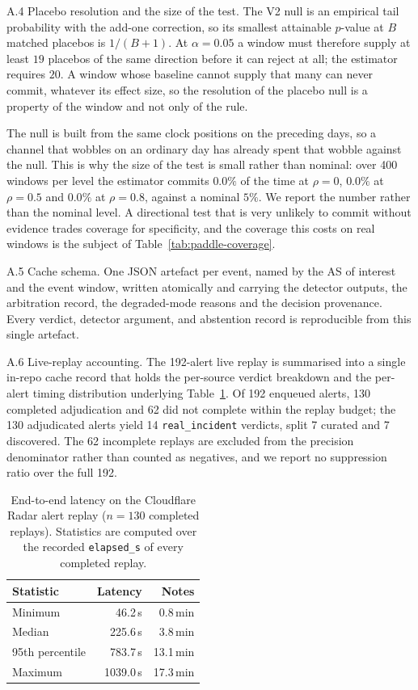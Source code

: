 A.4 Placebo resolution and the size of the test.\label{app:paddle-size}
The V2 null is an empirical tail probability with the add-one correction,
so its smallest attainable $p$-value at $B$ matched placebos is $1/(B+1)$.
At $\alpha=0.05$ a window must therefore supply at least $19$ placebos of
the same direction before it can reject at all; the estimator requires
$20$. A window whose baseline cannot supply that many can never commit,
whatever its effect size, so the resolution of the placebo null is a
property of the window and not only of the rule.

The null is built from the same clock positions on the preceding days, so
a channel that wobbles on an ordinary day has already spent that wobble
against the null. This is why the size of the test is small rather than
nominal: over 400 windows per level the estimator commits $0.0\%$ of the
time at $\rho=0$, $0.0\%$ at $\rho=0.5$ and $0.0\%$ at $\rho=0.8$,
against a nominal $5\%$. We report the number rather than the nominal
level. A directional test that is very unlikely to commit without
evidence trades coverage for specificity, and the coverage this costs on
real windows is the subject of Table~\ref{tab:paddle-coverage}.

A.5 Cache schema.  One JSON artefact per event, named by the AS of
interest and the event window, written atomically and carrying the
detector outputs, the arbitration record, the degraded-mode reasons and
the decision provenance.  Every verdict, detector argument, and
abstention record is reproducible from this single artefact.
\label{app:cache}

A.6 Live-replay accounting.  The 192-alert live replay is
summarised into a single in-repo cache record that holds the
per-source verdict breakdown and the per-alert timing distribution
underlying Table~\ref{tab:latency}. Of 192 enqueued alerts, 130
completed adjudication and 62 did not complete within the replay
budget; the 130 adjudicated alerts yield 14
\texttt{real\_incident} verdicts, split 7 curated and 7 discovered.
The 62 incomplete replays are excluded from the precision denominator
rather than counted as negatives, and we report no suppression ratio
over the full 192.

\begin{table}[!htbp]
\centering
\caption{End-to-end latency on the Cloudflare Radar alert replay
($n=130$ completed replays). Statistics are computed over the recorded
\texttt{elapsed\_s} of every completed replay.}
\label{tab:latency}
\small
\begin{tabular}{l r r}
\hline
\textbf{Statistic} & \textbf{Latency} & \textbf{Notes} \\
\hline
Minimum           & 46.2\,s  & 0.8\,min \\
Median            & 225.6\,s & 3.8\,min \\
95th percentile   & 783.7\,s & 13.1\,min \\
Maximum           & 1039.0\,s & 17.3\,min \\
\hline
\end{tabular}
\end{table}
\label{app:live-replay}

